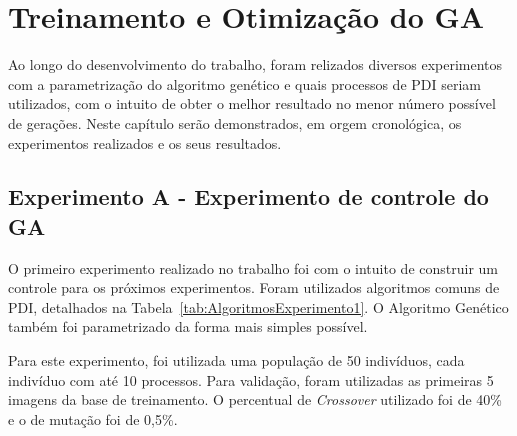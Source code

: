 \documentclass[12pt,oneside,a4paper,english,french,spanish,brazil,]{abntex2}
\begin{document}
\section{Treinamento e Otimização do GA}

Ao longo do desenvolvimento do trabalho, foram relizados diversos experimentos com a parametrização do algoritmo genético e quais processos de PDI seriam utilizados, com o intuito de obter o melhor resultado no menor número possível de gerações. Neste capítulo serão demonstrados, em orgem cronológica, os experimentos realizados e os seus resultados.

\subsection{Experimento A - Experimento de controle do GA}

O primeiro experimento realizado no trabalho foi com o intuito de construir um controle para os próximos experimentos. Foram utilizados algoritmos comuns de PDI, detalhados na Tabela~\ref{tab:AlgoritmosExperimento1}. O Algoritmo Genético também foi parametrizado da forma mais simples possível. 

Para este experimento, foi utilizada uma população de 50 indivíduos, cada indivíduo com até 10 processos. Para validação, foram utilizadas as primeiras 5 imagens da base de treinamento. O percentual de \textit{Crossover} utilizado foi de 40\% e o de mutação foi de 0,5\%.
\end{document}
